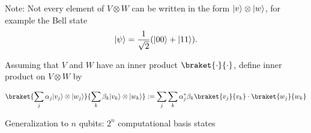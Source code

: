 Note: Not every element of $V \otimes W$ can be written in the form $\lvert v\rangle \otimes \lvert w\rangle$,
for example the Bell state
\begin{equation*}
    \lvert\psi\rangle = \frac{1}{\sqrt{2}} (\lvert00\rangle + \lvert11\rangle).
\end{equation*}

Assuming that $V$ and $W$ have an inner product $\braket{\cdot}{\cdot}$, define inner product
on $V \otimes W$ by

\begin{equation}
    \braket{\sum_j \alpha_j \ket{v_j} \otimes \ket{w_j}}
        {\sum_k \beta_k \ket{v_k} \otimes \ket{w_k}} :=
    \sum_j \sum_k \alpha_j^* \beta_k \braket{v_j}{v_k}\cdot \braket{w_j}{w_k}
\end{equation}


Generalization to $n$ qubits: $2^n$ computational basis states
